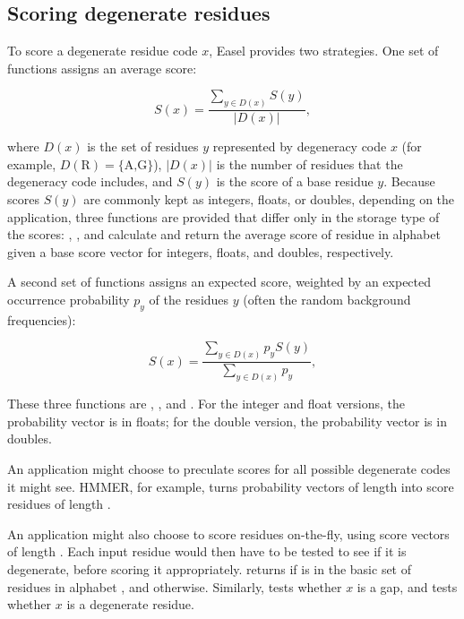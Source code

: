 \subsection{Scoring degenerate residues}

To score a degenerate residue code $x$, Easel provides two strategies.
One set of functions assigns an average score:

\[
  S(x) =  \frac{\sum_{y \in D(x)}  S(y) } { |D(x)| },
\]

where $D(x)$ is the set of residues $y$ represented by degeneracy code
$x$ (for example, $D(\mbox{R}) = \{ \mbox{A,G} \}$), $| D(x) |$ is the
number of residues that the degeneracy code includes, and $S(y)$ is
the score of a base residue $y$. Because scores $S(y)$ are commonly
kept as integers, floats, or doubles, depending on the application,
three functions are provided that differ only in the storage type of
the scores: ,
, and
 calculate and return the average
score of residue  in alphabet  given a base score
vector  for integers, floats, and doubles,
respectively.

A second set of functions assigns an expected score, weighted by an
expected occurrence probability $p_y$ of the residues $y$ (often the
random background frequencies):

\[
  S(x) =  \frac{\sum_{y \in D(x)}  p_y S(y) } { \sum_{y \in D(x)} p_y },
\]

These three functions are ,
, and
.  For the integer and float
versions, the probability vector is in floats; for the double version,
the probability vector is in doubles.

An application might choose to preculate scores for all possible
degenerate codes it might see. HMMER, for example, turns probability
vectors of length  into score residues of length .

An application might also choose to score residues on-the-fly, using
score vectors of length . Each input residue  would
then have to be tested to see if it is degenerate, before scoring it
appropriately.   returns 
if  is in the basic set of  residues in alphabet
, and  otherwise. Similarly,
 tests whether $x$ is a gap, and
 tests whether $x$ is a degenerate
residue.

